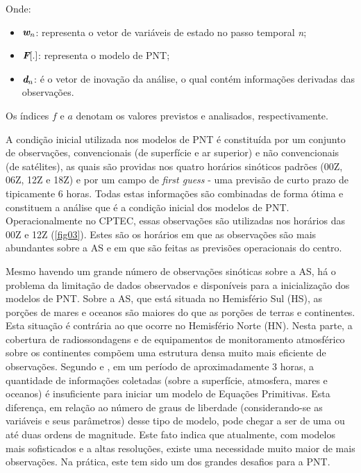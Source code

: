 Onde:

\begin{itemize}
\item $\textit{\textbf{w}}_{n}$: representa o vetor de variáveis de estado no passo temporal \textit{n};
\item $\textit{\textbf{F}}[.]$: representa o modelo de PNT;
\item $\textit{\textbf{d}}_{n}$: é o vetor de inovação da análise, o qual contém informações derivadas das observações.
\end{itemize}

Os índices $\textit{f}$ e $\textit{a}$ denotam os valores previstos e analisados, respectivamente.

A condição inicial utilizada nos modelos de PNT é constituída por um conjunto de observações, convencionais (de superfície e ar superior) e não convencionais (de satélites), as quais são providas nos quatro horários sinóticos padrões (00Z, 06Z, 12Z e 18Z) e por um campo de \textit{first guess} - uma previsão de curto prazo de tipicamente 6 horas. Todas estas informações são combinadas de forma ótima e constituem a análise que é a condição inicial dos modelos de PNT. Operacionalmente no CPTEC, essas observações são utilizadas nos horários das 00Z e 12Z (\autoref{fig03}). Estes são os horários em que as observações são mais abundantes sobre a AS e em que são feitas as previsões operacionais do centro. 

Mesmo havendo um grande número de observações sinóticas sobre a AS, há o problema da limitação de dados observados e disponíveis para a inicialização dos modelos de PNT. Sobre a AS, que está situada no Hemisfério Sul (HS), as porções de mares e oceanos são maiores do que as porções de terras e continentes. Esta situação é contrária ao que ocorre no Hemisfério Norte (HN). Nesta parte, a cobertura de radiossondagens e de equipamentos de monitoramento atmosférico sobre os continentes compõem uma estrutura densa muito mais eficiente de observações. Segundo \cite{morel80} e \cite{kalnay03}, em um período de aproximadamente 3 horas, a quantidade de informações coletadas (sobre a superfície, atmosfera, mares e oceanos) é insuficiente para iniciar um modelo de Equações Primitivas. Esta diferença, em relação ao número de graus de liberdade (considerando-se as variáveis e seus parâmetros) desse tipo de modelo, pode chegar a ser de uma ou até duas ordens de magnitude. Este fato indica que atualmente, com modelos mais sofisticados e a altas resoluções, existe uma necessidade muito maior de mais observações. Na prática, este tem sido um dos grandes desafios para a PNT. 

